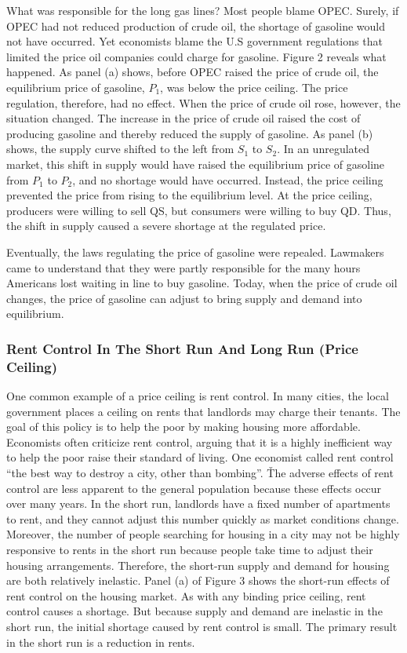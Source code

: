 What was responsible for the long gas lines? Most people blame OPEC. Surely, if OPEC had not reduced production of
crude oil, the shortage of gasoline would not have occurred. Yet economists blame the U.S government regulations that
limited the price oil companies could charge for gasoline. Figure 2 reveals what happened. As panel (a) shows, before
OPEC raised the price of crude oil, the equilibrium price of gasoline, $P_1$, was below the price ceiling. The price
regulation, therefore, had no effect. When the price of crude oil rose, however, the situation changed. The increase
in the price of crude oil raised the cost of producing gasoline and thereby reduced the supply of gasoline. As panel
(b) shows, the supply curve shifted to the left from $S_1$ to $S_2$. In an unregulated market, this shift in supply
would have raised the equilibrium price of gasoline from $P_1$ to $P_2$, and no shortage would have occurred.
Instead, the price ceiling prevented the price from rising to the equilibrium level. At the price ceiling, producers
were willing to sell QS, but consumers were willing to buy QD. Thus, the shift in supply caused a severe shortage at
the regulated price.


Eventually, the laws regulating the price of gasoline were repealed. Lawmakers came to understand that they were
partly responsible for the many hours Americans lost waiting in line to buy gasoline. Today, when the price of crude
oil changes, the price of gasoline can adjust to bring supply and demand into equilibrium.

\subsubsection*{Rent Control In The Short Run And Long Run (Price Ceiling)}

One common example of a price ceiling is rent control. In many cities, the local government places a ceiling on rents
that landlords may charge their tenants. The goal of this policy is to help the poor by making housing more
affordable. Economists often criticize rent control, arguing that it is a highly inefficient way to help the poor
raise their standard of living. One economist called rent control ``the best way to destroy a city, other than
bombing''. \v

The adverse effects of rent control are less apparent to the general population because these effects occur over many
years. In the short run, landlords have a fixed number of apartments to rent, and they cannot adjust this number
quickly as market conditions change. Moreover, the number of people searching for housing in a city may not be highly
responsive to rents in the short run because people take time to adjust their housing arrangements. Therefore, the
short-run supply and demand for housing are both relatively inelastic. Panel (a) of Figure 3 shows the short-run
effects of rent control on the housing market. As with any binding price ceiling, rent control causes a shortage. But
because supply and demand are inelastic in the short run, the initial shortage caused by rent control is small. The
primary result in the short run is a reduction in rents.

